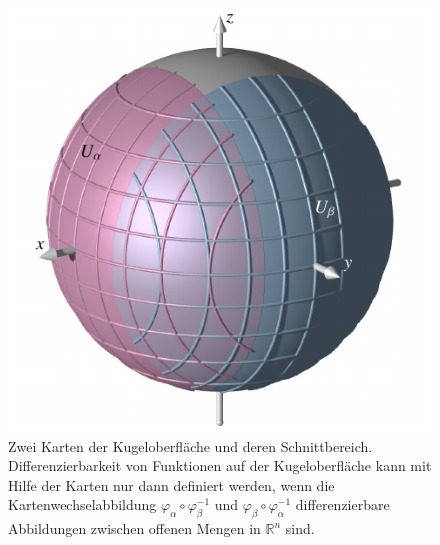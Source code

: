 %
%
%
\begin{figure}
\centering
\includegraphics{chapters/030-gruppen/images/kugelschnitt.pdf}
\caption{Zwei Karten der Kugeloberfläche und deren Schnittbereich.
Differenzierbarkeit von Funktionen auf der Kugeloberfläche kann mit
Hilfe der Karten nur dann definiert werden, wenn die Kartenwechselabbildung
$\varphi_\alpha\circ\varphi_\beta^{-1}$ und
$\varphi_\beta\circ\varphi_\alpha^{-1}$ differenzierbare Abbildungen
zwischen offenen Mengen in $\mathbb{R}^n$ sind.
\label{buch:gruppen:gruppe:fig:kugelkartenwechsel}}
\end{figure}
